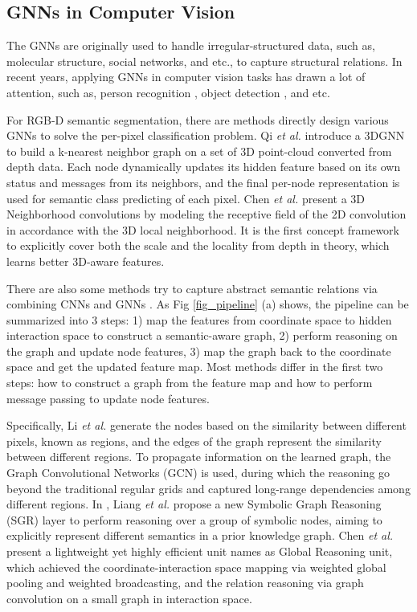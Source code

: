 ﻿\documentclass[journal]{IEEEtran}
\begin{document}
\subsection{GNNs in Computer Vision}  
 
    The GNNs are originally used to handle irregular-structured data, such as, molecular structure, social networks, and etc., to capture structural relations. In recent years, applying GNNs in computer vision tasks has drawn a lot of attention, such as, person recognition \cite{yao2022sparse}, object detection \cite{zhao2021graphfpn}\cite{shi2020point}\cite{zhang2021pc}, and etc. 
 
   
    For RGB-D semantic segmentation, there are methods directly design various GNNs to solve the per-pixel classification problem. Qi \emph{et al.} \cite{qi20173d} introduce a 3DGNN to build a k-nearest neighbor graph on a set of 3D point-cloud converted from depth data. Each node dynamically updates its hidden feature based on its own status and messages from its neighbors, and the final per-node representation is used for semantic class predicting of each pixel. Chen \emph{et al.} \cite{chen20193dneighbor} present a 3D Neighborhood convolutions by modeling the receptive field of the 2D convolution in accordance with the 3D local neighborhood. It is the first concept framework to explicitly cover both the scale and the locality from depth in theory, which learns better 3D-aware features.
    
    
    There are also some methods try to capture abstract semantic relations via combining CNNs and GNNs \cite{li2018beyondgrids}\cite{liang2018symbolicRG}\cite{chen2019glore}. As Fig \ref{fig_pipeline} (a) shows, the pipeline can be summarized into 3 steps: 1) map the features from coordinate space to hidden interaction space to construct a semantic-aware graph, 2) perform reasoning on the graph and update node features, 3) map the graph back to the coordinate space and get the updated feature map. Most methods differ in the first two steps: how to construct a graph from the feature map and how to perform message passing to update node features. 
    
    
    Specifically, Li \emph{et al.} \cite{li2018beyondgrids} generate the nodes based on the similarity between different pixels, known as regions, and the edges of the graph represent the similarity between different regions. To propagate information on the learned graph, the Graph Convolutional Networks (GCN) \cite{kipf2016GCN} is used, during which the reasoning go beyond the traditional regular grids and captured long-range dependencies among different regions. In \cite{liang2018symbolicRG}, Liang \emph{et al.} propose a new Symbolic Graph Reasoning (SGR) layer to perform reasoning over a group of symbolic nodes, aiming to explicitly represent different semantics in a prior knowledge graph. Chen \emph{et al.} \cite{chen2019glore} present a lightweight yet highly efficient unit names as Global Reasoning unit, which achieved the coordinate-interaction space mapping via weighted global pooling and weighted broadcasting, and the relation reasoning via graph convolution on a small graph in interaction space. 
\end{document}
